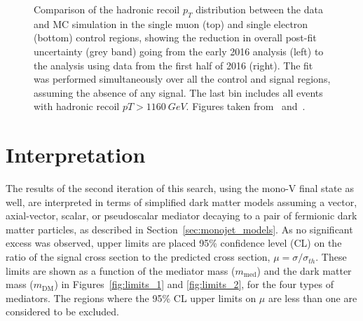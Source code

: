 \begin{figure}[p]
 \caption{Comparison of the hadronic recoil $p_T$ distribution between the data and MC simulation in the single muon (top) and single electron (bottom) control regions, showing the reduction in overall post-fit uncertainty (grey band) going from the early 2016 analysis (left) to the analysis using data from the first half of 2016 (right). The fit was performed simultaneously over all the control and signal regions, assuming the absence of any signal. The last bin includes all events with hadronic recoil $pT > \SI{1160}{GeV}$. Figures taken from~\cite{CMS:2016tns} and~\cite{Sirunyan:2017hci}.}
 \label{fig:comparison2}
\end{figure}

\section{Interpretation}
\label{sec:interpretation}

The results of the second iteration of this search, using the mono-V final state as well, are interpreted in terms of simplified dark matter models assuming a vector, axial-vector, scalar, or pseudoscalar mediator decaying to a pair of fermionic dark matter particles, as described in Section~\ref{sec:monojet_models}. As no significant excess was observed, upper limits are placed  95\% confidence level (CL) on the ratio of the signal cross section to the predicted cross section, $\mu = \sigma/\sigma_{th}$. These limits are shown as a function of the mediator mass ($m_{\mathrm{med}}$) and the dark matter mass ($m_{\mathrm{DM}}$) in Figures~\ref{fig:limits_1} and \ref{fig:limits_2}, for the four types of mediators. The regions where the 95\% CL upper limits on $\mu$ are less than one are considered to be excluded.


